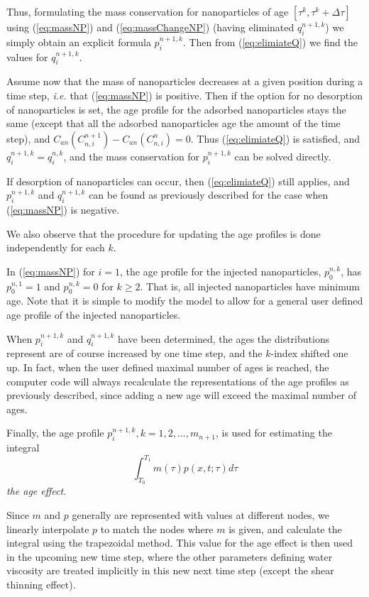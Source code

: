 \documentclass[nanomaterials,article,submit,moreauthors,pdftex]{Definitions/mdpi}
\begin{document}
Thus, formulating the mass conservation for nanoparticles of age $\left[\tau^k, \tau^k+\Delta\tau\right]$ using (\ref{eq:massNP}) and (\ref{eq:massChangeNP}) (having eliminated  $q_i^{n+1,k}$) we simply obtain an explicit formula $p_i^{n+1,k}$. Then from (\ref{eq:elimiateQ}) we find the values for $q_i^{n+1,k}$.

Assume now that the mass of nanoparticles decreases at a given position during a time step, \textit{i.e.} that (\ref{eq:massNP}) is positive. Then if the option for no desorption of nanoparticles is set, the age profile for the adsorbed nanoparticles stays the same (except that all the adsorbed nanoparticles age the amount of the time step), and $C_{an}(C_{n,i}^{n+1})- C_{an}(C_{n,i}^{n})=0$. Thus (\ref{eq:elimiateQ}) is satisfied, and $q_i^{n+1,k}=q_i^{n,k}$, and the mass conservation for $p_i^{n+1,k}$ can be solved directly.

If desorption of nanoparticles can occur, then (\ref{eq:elimiateQ}) still applies, and $p_i^{n+1,k}$ and  $q_i^{n+1,k}$ can be found as previously described for the case when (\ref{eq:massNP}) is negative. 

We also observe that the procedure for updating the age profiles is done independently for each $k$.

In (\ref{eq:massNP}) for $i=1$, the age profile for the injected nanoparticles, $p_0^{n,k}$, has $p_0^{n,1}=1$ and $p_0^{n,k}=0$ for $k\geq2$. That is, all injected nanoparticles have minimum age. Note that it is simple to modify the model to allow for a general user defined age profile of the injected nanoparticles.

When $p_i^{n+1,k}$ and $q_i^{n+1,k}$ have been determined, the ages the distributions represent are of course increased by one time step, and the  $k$-index shifted one up. In fact, when the user defined maximal number of ages is reached, the computer code will always recalculate the representations of the age profiles as previously described, since adding a new age will exceed the maximal number of ages.

Finally, the age profile $p_i^{n+1,k},k=1,2,...,m_{n+1}$,  is used for estimating the integral
\begin{equation}
    \int_{T_0}^{T_1} m(\tau)p(x,t;\tau)d\tau
\end{equation}
\textit{the age effect}.

Since $m$ and $p$ generally are represented with values at different nodes, we linearly interpolate $p$ to match the nodes where $m$ is given, and calculate the integral using the trapezoidal method. This value for the age effect is then used in the upcoming new time step, where the other parameters defining water viscosity are treated implicitly in this new next time step (except the shear thinning effect).
\end{document}
